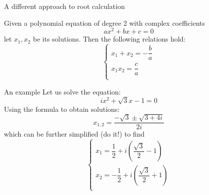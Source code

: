 \documentclass[10pt]{beamer}
\begin{document}
\begin{frame}{A different approach to root calculation}
\begin{theorem}
	Given a polynomial equation of degree 2 with complex coefficients
	\[ ax^2 + bx + c = 0 \]
	let $x_1, x_2$ be its solutions. Then the following relations hold:
	\[ \begin{cases}
		x_1 + x_2  = -\dfrac{b}{a}\\
		x_1x_2 = \dfrac{c}{a}\\
	\end{cases}\]
\end{theorem}
\end{frame}

\begin{frame}{An example}
	Let us solve the equation:
	\[ ix^2 + \sqrt{3}x - 1 = 0 \]
	Using the formula to obtain solutions:
	\[ x_{1,2} = \dfrac{-\sqrt{3} \pm \sqrt{3 + 4i}}{2i} \]
 	which can be further simplified (do it!) to find
 	\[ \begin{cases}
 	 x_1 = \dfrac{1}{2} + i\left(\dfrac{\sqrt{3}}{2} - 1 \right)\\
 	 x_2 = -\dfrac{1}{2} + i\left(\dfrac{\sqrt{3}}{2} + 1 \right)\\
 	\end{cases}\]
\end{frame}
\appendix
\end{document}
